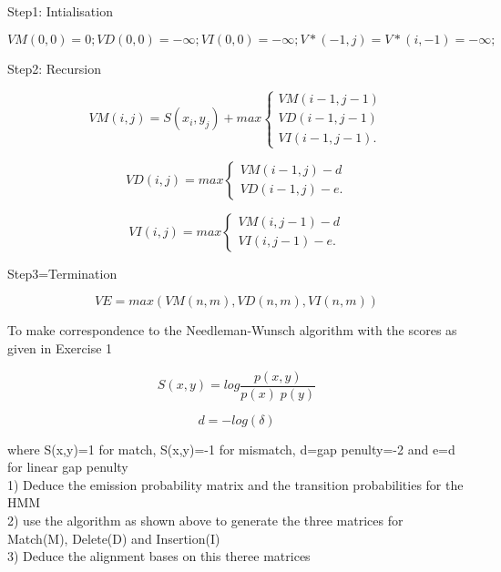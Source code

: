 \documentclass[a4paper,11pt]{article}
\begin{document}
Step1: Intialisation




\[
VM(0,0)=0; VD(0,0)=-\infty ; VI(0,0)=-\infty;
V*(-1,j)=V*(i,-1)=-\infty;\]


Step2: Recursion

\[ VM(i,j) =S(x_{i},y_{j})+max \left\{ \begin{array}{ll}
	 VM(i-1,j-1)\\
         VD(i-1,j-1) \\
         VI(i-1,j-1)  .\end{array} \right. \] 

\[ VD(i,j) =max \left\{ \begin{array}{ll}
         VM(i-1,j)-d \\
         VD(i-1,j)-e  .\end{array} \right. \] 

\[ VI(i,j) =max \left\{ \begin{array}{ll}
         VM(i,j-1)-d \\
         VI(i,j-1)-e  .\end{array} \right. \]



Step3=Termination

\[ VE=max(VM(n,m),VD(n,m),VI(n,m))\]

   


To make correspondence to the Needleman-Wunsch algorithm with the scores as given in Exercise 1

\[
S(x,y)=log\frac{p(x,y)}{p(x)\; p(y)}\]

\[
d=-log(\delta)\]

where S(x,y)=1 for match, S(x,y)=-1 for mismatch, d=gap penulty=-2 and e=d for linear gap penulty\\

1) Deduce the emission probability matrix and the transition probabilities for the HMM \\
2) use the algorithm as shown above to generate the three matrices for Match(M), Delete(D) and Insertion(I)\\
3) Deduce the alignment bases on this theree matrices
\end{document}
